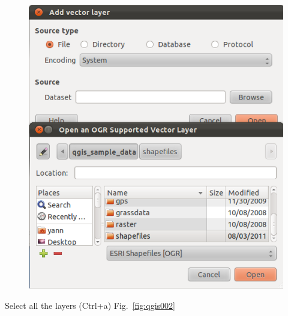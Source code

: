 \begin{figure}[htbp]
   \centering
   \includegraphics[scale=0.35]{qgis001.png}
   \caption{}
   \label{fig:qgis001}
\end{figure}

Select all the layers (Ctrl+a) Fig.~\ref{fig:qgis002}

